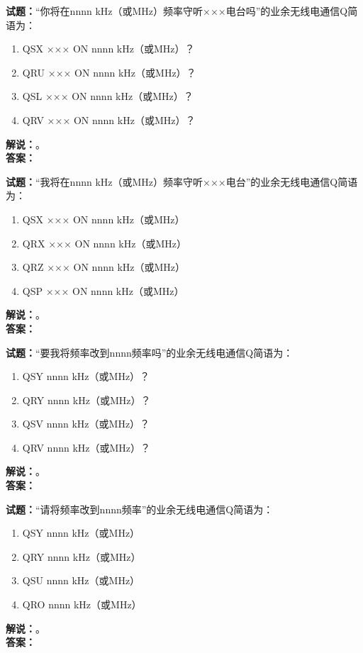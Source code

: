 \documentclass{ctexbook}
\begin{document}
\bigskip

\noindent\textbf{试题：}“你将在nnnn \si{\kHz}（或\unit{\MHz}）频率守听×××电台吗”的业余无线电通信Q简语为：
\begin{enumerate}[leftmargin=3em]
  \item QSX ××× ON nnnn \si{\kHz}（或\unit{\MHz}）？
  \item QRU ××× ON nnnn \si{\kHz}（或\unit{\MHz}）？
  \item QSL ××× ON nnnn \si{\kHz}（或\unit{\MHz}）？
  \item QRV ××× ON nnnn \si{\kHz}（或\unit{\MHz}）？
\end{enumerate}
\noindent\textbf{解说：}\textbf{}。\\\noindent\textbf{答案：}

\bigskip

\noindent\textbf{试题：}“我将在nnnn \si{\kHz}（或\unit{\MHz}）频率守听×××电台”的业余无线电通信Q简语为：
\begin{enumerate}[leftmargin=3em]
  \item QSX ××× ON nnnn \si{\kHz}（或\unit{\MHz}）
  \item QRX ××× ON nnnn \si{\kHz}（或\unit{\MHz}）
  \item QRZ ××× ON nnnn \si{\kHz}（或\unit{\MHz}）
  \item QSP ××× ON nnnn \si{\kHz}（或\unit{\MHz}）
\end{enumerate}
\noindent\textbf{解说：}\textbf{}。\\\noindent\textbf{答案：}

\bigskip

\noindent\textbf{试题：}“要我将频率改到nnnn频率吗”的业余无线电通信Q简语为：
\begin{enumerate}[leftmargin=3em]
  \item QSY nnnn \si{\kHz}（或\unit{\MHz}）？
  \item QRY nnnn \si{\kHz}（或\unit{\MHz}）？
  \item QSV nnnn \si{\kHz}（或\unit{\MHz}）？
  \item QRV nnnn \si{\kHz}（或\unit{\MHz}）？
\end{enumerate}
\noindent\textbf{解说：}\textbf{}。\\\noindent\textbf{答案：}

\bigskip

\noindent\textbf{试题：}“请将频率改到nnnn频率”的业余无线电通信Q简语为：
\begin{enumerate}[leftmargin=3em]
  \item QSY nnnn \si{\kHz}（或\unit{\MHz}）
  \item QRY nnnn \si{\kHz}（或\unit{\MHz}）
  \item QSU nnnn \si{\kHz}（或\unit{\MHz}）
  \item QRO nnnn \si{\kHz}（或\unit{\MHz}）
\end{enumerate}
\noindent\textbf{解说：}\textbf{}。\\\noindent\textbf{答案：}
\end{document}
